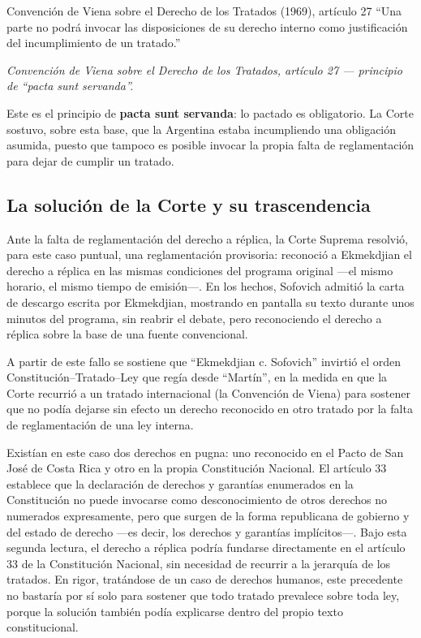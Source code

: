 \documentclass[12pt,oneside]{book}
\begin{document}
\begin{definition}{Convención de Viena sobre el Derecho de los Tratados (1969), artículo 27}
``Una parte no podrá invocar las disposiciones de su derecho interno como justificación del incumplimiento de un tratado.''

\textit{Convención de Viena sobre el Derecho de los Tratados, artículo 27 --- principio de ``pacta sunt servanda''.}
\end{definition}

Este es el principio de \textbf{pacta sunt servanda}: lo pactado es obligatorio. La Corte sostuvo, sobre esta base, que la Argentina estaba incumpliendo una obligación asumida, puesto que tampoco es posible invocar la propia falta de reglamentación para dejar de cumplir un tratado.

\subsection{La solución de la Corte y su trascendencia}

Ante la falta de reglamentación del derecho a réplica, la Corte Suprema resolvió, para este caso puntual, una reglamentación provisoria: reconoció a Ekmekdjian el derecho a réplica en las mismas condiciones del programa original —el mismo horario, el mismo tiempo de emisión—. En los hechos, Sofovich admitió la carta de descargo escrita por Ekmekdjian, mostrando en pantalla su texto durante unos minutos del programa, sin reabrir el debate, pero reconociendo el derecho a réplica sobre la base de una fuente convencional.

A partir de este fallo se sostiene que ``Ekmekdjian c. Sofovich'' invirtió el orden Constitución–Tratado–Ley que regía desde ``Martín'', en la medida en que la Corte recurrió a un tratado internacional (la Convención de Viena) para sostener que no podía dejarse sin efecto un derecho reconocido en otro tratado por la falta de reglamentación de una ley interna.

\begin{note}
Existían en este caso dos derechos en pugna: uno reconocido en el Pacto de San José de Costa Rica y otro en la propia Constitución Nacional. El artículo 33 establece que la declaración de derechos y garantías enumerados en la Constitución no puede invocarse como desconocimiento de otros derechos no numerados expresamente, pero que surgen de la forma republicana de gobierno y del estado de derecho —es decir, los derechos y garantías implícitos—. Bajo esta segunda lectura, el derecho a réplica podría fundarse directamente en el artículo 33 de la Constitución Nacional, sin necesidad de recurrir a la jerarquía de los tratados. En rigor, tratándose de un caso de derechos humanos, este precedente no bastaría por sí solo para sostener que todo tratado prevalece sobre toda ley, porque la solución también podía explicarse dentro del propio texto constitucional.
\end{note}
\end{document}
